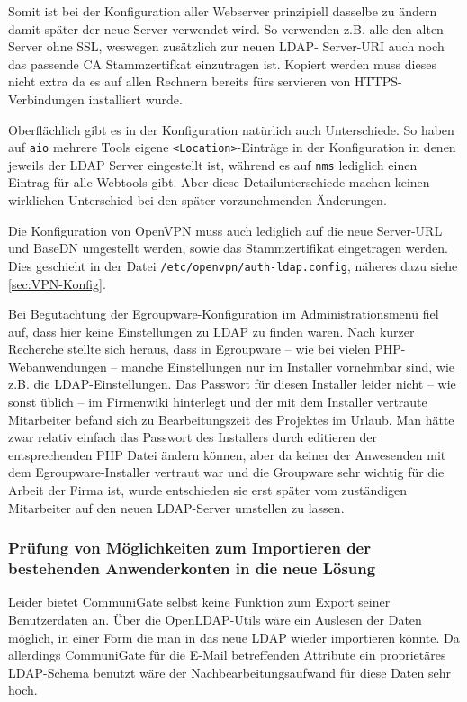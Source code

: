 \documentclass[11pt,a4paper,titlepage=firstiscover,headsepline,bibtotoc]{scrartcl} %
\begin{document}
Somit ist bei der Konfiguration aller Webserver prinzipiell dasselbe zu ändern damit später der neue Server verwendet wird. So verwenden z.B. alle den alten Server ohne SSL, weswegen zusätzlich zur neuen LDAP- Server-URI auch noch das passende CA Stammzertifkat einzutragen ist. Kopiert werden muss dieses nicht extra da es auf allen Rechnern bereits fürs servieren von HTTPS-Verbindungen installiert wurde. 

Oberflächlich gibt es in der Konfiguration natürlich auch Unterschiede. So haben auf \texttt{aio} mehrere Tools eigene \texttt{<Location>}-Einträge in der Konfiguration in denen jeweils der LDAP Server eingestellt ist, während es auf \texttt{nms} lediglich einen Eintrag für alle Webtools gibt. Aber diese Detailunterschiede machen keinen wirklichen Unterschied bei den später vorzunehmenden Änderungen.

Die Konfiguration von OpenVPN muss auch lediglich auf die neue Server-URL und BaseDN umgestellt werden, sowie das Stammzertifikat eingetragen werden. Dies geschieht in der Datei \texttt{/etc/openvpn/auth-ldap.config}, näheres dazu siehe \autoref{sec:VPN-Konfig}.

Bei Begutachtung der Egroupware-Konfiguration im Administrationsmenü fiel auf, dass hier keine Einstellungen zu LDAP zu finden waren. Nach kurzer Recherche stellte sich heraus, dass in Egroupware -- wie bei vielen PHP-Webanwendungen -- manche Einstellungen nur im Installer vornehmbar sind, wie z.B. die LDAP-Einstellungen. Das Passwort für diesen Installer leider nicht -- wie sonst üblich -- im Firmenwiki hinterlegt und der mit dem Installer vertraute Mitarbeiter befand sich zu Bearbeitungszeit des Projektes im Urlaub. Man hätte zwar relativ einfach das Passwort des Installers durch editieren der entsprechenden PHP Datei ändern können, aber da keiner der Anwesenden mit dem Egroupware-Installer vertraut war und die Groupware sehr wichtig für die Arbeit der Firma ist, wurde entschieden sie erst später vom zuständigen Mitarbeiter auf den neuen LDAP-Server umstellen zu lassen. 

\subsubsection{Prüfung von Möglichkeiten zum Importieren der bestehenden Anwenderkonten in die neue Lösung} \label{sec:Importsuche}
Leider bietet CommuniGate selbst keine Funktion zum Export seiner Benutzerdaten an. Über die OpenLDAP-Utils wäre ein Auslesen der Daten möglich, in einer Form die man in das neue LDAP wieder importieren könnte. Da allerdings CommuniGate für die E-Mail betreffenden Attribute ein proprietäres LDAP-Schema benutzt wäre der Nachbearbeitungsaufwand für diese Daten sehr hoch. 
\end{document}
